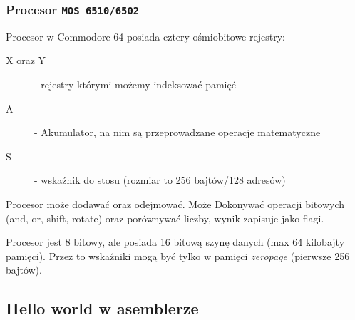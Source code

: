 \documentclass[aspectratio=169]{beamer}
\newif\ifmore
\begin{document}
\ifmore
    \begin{frame}
        \frametitle{Mapy pamięci}
        \textbf{Procesory} mogą czytać i zapisywać bezpośrednio nie tylko do pamięci \texttt{RAM}

        \pause\vspace{5mm}

        Jako iż komodorek nie posiada systemu operacyjnego, to mamy dowolność w wyborze gdzie co damy, poza paroma wymogami: \pause
        \begin{itemize}
            \item Program zaczyna się na adresie \texttt{\$4000}. \pause
            \item Pointery działają tylko w pierwszych 256 bajtach.\pause
            \item Kolejne 256 bajtów to stos procesora.\pause
            \item Część pamięci to pamięć ROM z kernalem, można ją zamienić na \texttt{RAM}, ale my go potrzebujemy.\pause
            \item Część pamięci przechowuje takie informacje jak tekst na ekranie, kolor tekstu, inna część to porty szeregowe, klawiatura itp.
        \end{itemize}
    \end{frame}
\fi

\begin{frame}
    \frametitle{Procesor \texttt{MOS 6510/6502}}
    Procesor w Commodore 64 posiada cztery ośmiobitowe rejestry:\pause
    \begin{description}
        \item[X oraz Y] - rejestry którymi możemy indeksować pamięć
        \item[A] - Akumulator, na nim są przeprowadzane operacje matematyczne
        \item[S] - wskaźnik do stosu (rozmiar to 256 bajtów/128 adresów)
    \end{description}
    \pause
    Procesor może dodawać oraz odejmować. Może Dokonywać operacji bitowych (and, or, shift, rotate) oraz porównywać liczby, wynik zapisuje jako flagi.

    \pause\vspace{5mm}

    Procesor jest 8 bitowy, ale posiada 16 bitową szynę danych (max 64 kilobajty pamięci). Przez to wskaźniki mogą być tylko w pamięci \emph{zeropage} (pierwsze 256 bajtów).
\end{frame}

\subsection{Hello world w asemblerze}
\end{document}
